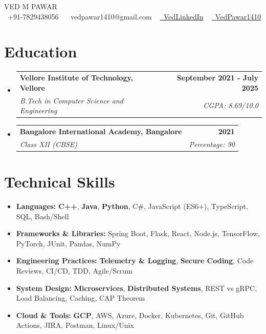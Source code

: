 \documentclass[letterpaper,11pt]{article}
\makeatletter
\newcommand{\resumeItem}[1]{
  \item\small{
    {#1 \vspace{-2pt}}
  }
}
\newcommand{\resumeSubheading}[4]{
  \vspace{-2pt}\item
    \begin{tabular*}{1.0\textwidth}[t]{l@{\extracolsep{\fill}}r}
      \textbf{#1} & \textbf{\small #2} \\
      \textit{\small#3} & \textit{\small #4} \\
    \end{tabular*}\vspace{-7pt}
}
\newcommand{\resumeSubHeadingListStart}{\begin{itemize}[leftmargin=0.0in, label={}]}
\newcommand{\resumeSubHeadingListEnd}{\end{itemize}}
\newcommand{\resumeItemListStart}{\begin{itemize}}
\newcommand{\resumeItemListEnd}{\end{itemize}\vspace{-5pt}}
\makeatother
\begin{document}
\begin{center}
    {\Huge \scshape VED M PAWAR} \\ \vspace{1pt}
    \small
    \raisebox{-0.1\height}\faPhone\ +91-7829438056 ~
    {\faEnvelope\ vedpawar1410@gmail.com} ~ 
    \href{https://www.linkedin.in/in/ved-pawar-27bab6219/}{\faLinkedin\ VedLinkedIn}  ~
    \href{https://github.com/VedPawar1410}{\faGithub\ VedPawar1410}
    \vspace{-2pt}
     \\ \vspace{1pt}
    \vspace{-4pt}
\end{center}
\vspace{-10pt}
\section{Education}
  \resumeSubHeadingListStart
    \resumeSubheading
      {Vellore Institute of Technology, Vellore}{September 2021 - July 2025}
      {B.Tech in Computer Science and Engineering }{CGPA: 8.69/10.0}
      \vspace{-3pt}
    \resumeSubheading
      {Bangalore International Academy, Bangalore}{2021}
      {Class XII (CBSE)}{Percentage: 90}
  \resumeSubHeadingListEnd
\vspace{-9pt} 

\section{Technical Skills}
 \resumeSubHeadingListStart
 \resumeItemListStart
    \vspace{-6pt}
    \resumeItem{\textbf{Languages:} \textbf{C++}, \textbf{Java}, \textbf{Python}, C\#, JavaScript (ES6+), TypeScript, SQL, Bash/Shell}
    \resumeItem{\textbf{Frameworks \& Libraries:} Spring Boot, Flask, React, Node.js, TensorFlow, PyTorch, JUnit, Pandas, NumPy}
    \resumeItem{\textbf{Engineering Practices:} \textbf{Telemetry \& Logging}, \textbf{Secure Coding}, Code Reviews, CI/CD, TDD, Agile/Scrum}
    \resumeItem{\textbf{System Design:} \textbf{Microservices}, \textbf{Distributed Systems}, REST vs gRPC, Load Balancing, Caching, CAP Theorem}
    \resumeItem{\textbf{Cloud \& Tools:} \textbf{GCP}, AWS, Azure, Docker, Kubernetes, Git, GitHub Actions, JIRA, Postman, Linux/Unix}
 \resumeItemListEnd
 \resumeSubHeadingListEnd
\vspace{-15pt} 
\end{document}
